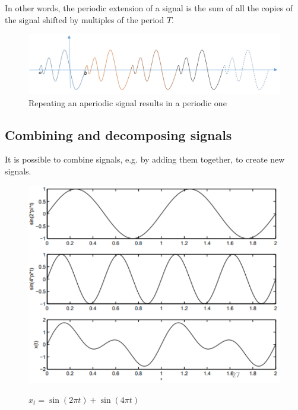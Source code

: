 In other words, the periodic extension of a signal is the sum of all the copies of the signal shifted by multiples of the period $T$.

\begin{figure}[htbp]
   \centering
   \includegraphics{images/signals_aperiodic.png}
   \caption{Repeating an aperiodic signal results in a periodic one}
   \label{fig:signals_aperiodic}
\end{figure}


\subsection{Combining and decomposing signals}
It is possible to combine signals, e.g. by adding them together, to create new signals.
\begin{figure}[htbp]
   \centering
   \includegraphics{images/signals_combination.png}
   \label{fig:signals_combination}

   $x_t = \sin(2\pi t) + \sin(4\pi t)$
\end{figure}

